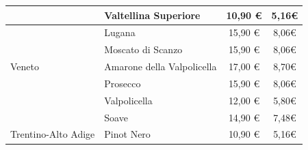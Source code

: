 \documentclass[12pt, a4paper]{article}
\begin{document}
\begin{longtable}{@{}|l|l|c|c|}
                         & Valtellina Superiore                                                      & 10,90 €                                                          & 5,16€                                                                                                         \\ \hline
                         & Lugana                                                                    & 15,90 €                                                         & 8,06€                                                                                                         \\ \hline
                         & Moscato di Scanzo                                                         & 15,90 €                                                         & 8,06€                                                                                                         \\ \hline
    Veneto               & Amarone della Valpolicella                                                & 17,00 €                                                         & 8,70€                                                                                                         \\ \hline
                         & Prosecco                                                                  & 15,90 €                                                         & 8,06€                                                                                                         \\ \hline
                         & Valpolicella                                                              & 12,00 €                                                         & 5,80€                                                                                                         \\ \hline
                         & Soave                                                                     & 14,90 €                                                         & 7,48€                                                                                                         \\ \hline
    Trentino-Alto Adige  & Pinot Nero                                                                & 10,90 €                                                          & 5,16€                                                                                                         \\ \hline

\end{longtable}
\end{document}
